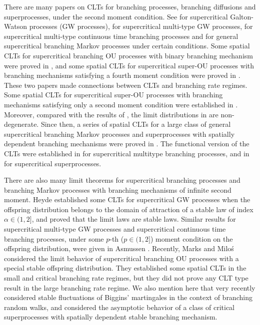 \documentclass[EJP]{ejpecp} %
\begin{document}
	There are many papers on CLTs for branching processes, branching diffusions 
	and superprocesses, under the second moment condition.
	See \cite{Heyde1970A-rate, HeydeBrown1871An-invariance, HeydeLeslie1971Improved} for supercritical Galton-Watson processes (GW processes), \cite{KestenStigum1966Additional,KestenStigum1966A-limit} for supercritical multi-type GW processes, \cite{Athreya1969Limit,Athreya1969LimitB,Athreya1971Some} for supercritical multi-type continuous time branching processes and \cite{AsmussenHering1983Branching} for general supercritical branching Markov processes under certain conditions.
	Some spatial CLTs for supercritical branching OU processes with binary branching mechanism were proved 
	in \cite{AdamczakMilos2015CLT}, and some 
	spatial CLTs for supercritical super-OU processes with branching mechanisms satisfying a fourth moment condition were proved in \cite{Milos2012Spatial}.
	These two papers made connections between CLTs and branching rate regimes.
	Some spatial CLTs  for supercritical super-OU  processes with branching mechanisms satisfying only a second moment condition were established in \cite{RenSongZhang2014Central}.
	Moreover, compared with the results of \cite{AdamczakMilos2015CLT,Milos2012Spatial}, the limit distributions in \cite{RenSongZhang2014Central} are non-degenerate.
	Since then, a series of spatial CLTs for a large class of general supercritical branching Markov processes and superprocesses with spatially dependent branching mechanisms were proved in \cite{RenSongZhang2014CentralB,RenSongZhang2015Central,RenSongZhang2017Central}.
	The functional version of the CLTs were established in \cite{Janson2004Functional} for supercritical multitype branching processes, and in \cite{RenSongZhang2017Functional} for supercritical superprocesses.

	There are also many limit theorems for supercritical branching processes and branching Markov processes with branching mechanisms of infinite second moment.
	Heyde \cite{Heyde1971Some} established some  CLTs for supercritical GW processes when the offspring distribution belongs to the domain of attraction of a stable law of index $\alpha\in (1, 2]$, and proved that the limit laws are stable laws.
	Similar results  for supercritical multi-type GW processes and supercritical continuous time branching processes, under some $p$-th ($p\in(1,2]$) moment condition on the offspring distribution, were given in Asmussen \cite{Asmussen76Convergence}.
	Recently, Marks and Milo\'s \cite{MarksMilos2018CLT} considered the limit behavior of supercritical branching OU processes with a special stable offspring distribution.
	They established some spatial CLTs in the small and critical branching rate regimes, but they did not prove any CLT type result in the large branching rate regime.
	We also mention here that very recently \cite{IksanovKoleskoMeiners2018Stable-like} considered stable fluctuations of Biggins' martingales in the context of 
	branching random walks, and \cite{RenSongSun2018Limit} considered 
	the asymptotic behavior of a class of critical superprocesses with spatially dependent stable branching mechanism.
\end{document}
